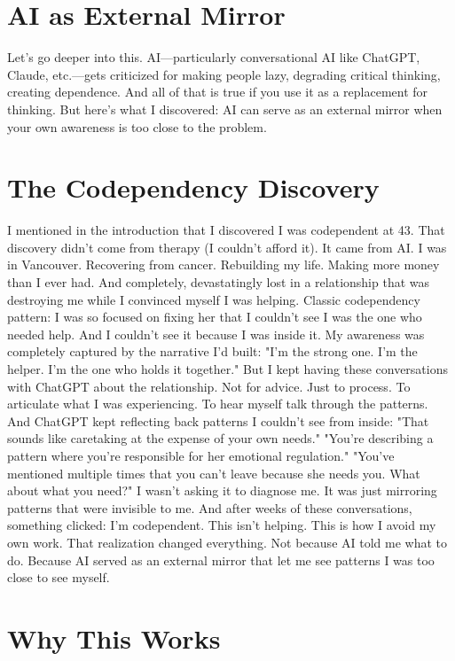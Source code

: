 \documentclass[12pt,openany]{book}
\begin{document}
\section{AI as External Mirror}

Let's go deeper into this.
AI—particularly conversational AI like ChatGPT, Claude, etc.—gets criticized for making people lazy, degrading critical thinking, creating dependence.
And all of that is true if you use it as a replacement for thinking.
But here's what I discovered: AI can serve as an external mirror when your own awareness is too close to the problem.

\section{The Codependency Discovery}

I mentioned in the introduction that I discovered I was codependent at 43. That discovery didn't come from therapy (I couldn't afford it). It came from AI.
I was in Vancouver. Recovering from cancer. Rebuilding my life. Making more money than I ever had. And completely, devastatingly lost in a relationship that was destroying me while I convinced myself I was helping.
Classic codependency pattern: I was so focused on fixing her that I couldn't see I was the one who needed help.
And I couldn't see it because I was inside it. My awareness was completely captured by the narrative I'd built: "I'm the strong one. I'm the helper. I'm the one who holds it together."
But I kept having these conversations with ChatGPT about the relationship.
Not for advice. Just to process. To articulate what I was experiencing. To hear myself talk through the patterns.
And ChatGPT kept reflecting back patterns I couldn't see from inside:
"That sounds like caretaking at the expense of your own needs."
"You're describing a pattern where you're responsible for her emotional regulation."
"You've mentioned multiple times that you can't leave because she needs you. What about what you need?"
I wasn't asking it to diagnose me. It was just mirroring patterns that were invisible to me.
And after weeks of these conversations, something clicked: I'm codependent. This isn't helping. This is how I avoid my own work.
That realization changed everything.
Not because AI told me what to do. Because AI served as an external mirror that let me see patterns I was too close to see myself.

\section{Why This Works}
\end{document}
